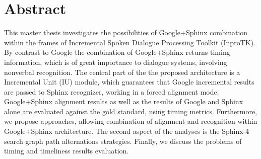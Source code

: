 \chapter*{Abstract}
This master thesis investigates the possibilities of Google+Sphinx combination within the frames of Incremental Spoken Dialogue 
Processing Toolkit (InproTK). By contrast to Google the combination of
Google+Sphinx returns timing information, which is of great importance to
dialogue systems, involving nonverbal recognition. The central part of the the
proposed architecture is a Incremental Unit (IU) module, which guarantees that Google incremental results are passed to 
Sphinx recognizer, working in a forced alignment mode. Google+Sphinx alignment
results as well as the results of Google and Sphinx alone are evaluated against the gold standard, using
timing metrics. Furthermore, we propose approaches, allowing combination of
alignment and recognition within  Google+Sphinx architecture. The second aspect
of the analyses is the Sphinx-4 search graph path alternations strategies.
Finally, we discuss the problems of timing and timeliness results evaluation.

